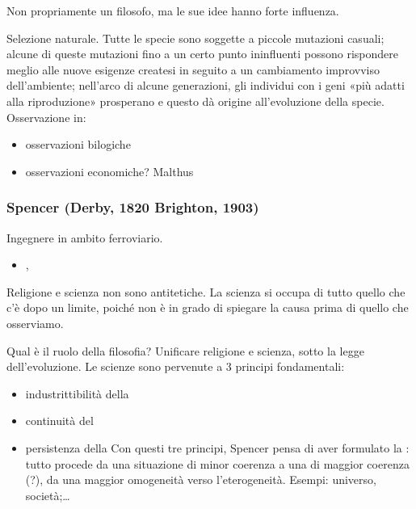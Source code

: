 \documentclass[letterpaper,10pt,italian]{jupyterBook}
\begin{document}
\sphinxAtStartPar
Non propriamente un filosofo, ma le sue idee hanno forte influenza.

\sphinxAtStartPar
{} Selezione naturale. Tutte le specie sono soggette a piccole mutazioni casuali; alcune di queste mutazioni \sphinxhyphen{} fino a un certo punto ininfluenti \sphinxhyphen{} possono rispondere meglio alle nuove esigenze createsi in seguito a un cambiamento improvviso dell’ambiente; nell’arco di alcune generazioni, gli individui con i geni «più adatti alla riproduzione» prosperano e questo dà origine all’evoluzione della specie. Osservazione in:
\begin{itemize}
\item {} 
\sphinxAtStartPar
osservazioni bilogiche

\item {} 
\sphinxAtStartPar
osservazioni economiche? Malthus

\end{itemize}
\label{\detokenize{ch/history:pc-spencer}}\subsubsection*{Spencer (Derby, 1820 \sphinxhyphen{} Brighton, 1903)}

\sphinxAtStartPar
{} Ingegnere in ambito ferroviario.

\sphinxAtStartPar
{}
\begin{itemize}
\item {} 
,

\end{itemize}

\sphinxAtStartPar
{} Religione e scienza non sono antitetiche. La scienza si occupa di tutto quello che c’è dopo un limite, poiché non è in grado di spiegare la causa prima di quello che osserviamo.

\sphinxAtStartPar
Qual è il ruolo della filosofia? Unificare religione e scienza, sotto la legge dell’evoluzione. Le scienze sono pervenute a 3 principi fondamentali:
\begin{itemize}
\item {} 
\sphinxAtStartPar
industrittibilità della 

\item {} 
\sphinxAtStartPar
continuità del 

\item {} 
\sphinxAtStartPar
persistenza della 
Con questi tre principi, Spencer pensa di aver formulato la : tutto procede da una situazione di minor coerenza a una di maggior coerenza (?), da una maggior omogeneità verso l’eterogeneità. Esempi: universo, società;…

\end{itemize}
\end{document}
